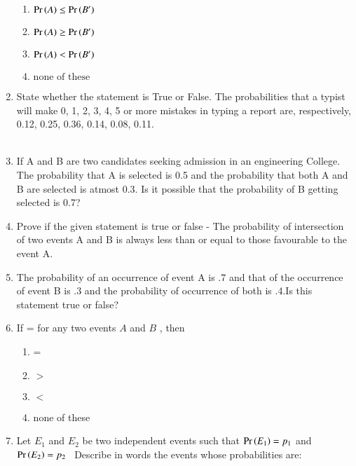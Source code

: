 \begin{enumerate}[label=\thesection.\arabic*,ref=\thesection.\theenumi]
\begin{enumerate}
\item $\Pr\left(A\right) \leq\Pr\left(B^\prime\right)$\\
\item $\Pr\left(A\right) \geq \Pr\left(B^\prime\right)$\\
\item $\Pr\left(A\right) < \Pr\left(B^\prime\right)$\\
\item $\text{none of these}$
\end{enumerate}

\item State whether the statement is True or False. The probabilities that a typist will make 0, 1, 2, 3, 4, 5 or more mistakes in typing a report are, respectively, 0.12, 0.25, 0.36, 0.14, 0.08, 0.11.\\
\solution
\\

\item If A and B are two candidates seeking admission in an engineering College. The probability that A is selected is 0.5 and the probability that both A and B are selected is atmost 0.3. Is it possible that the probability of B getting selected is 0.7?\\

\item Prove if the given statement is true or false - The probability of intersection of two events A and B is always less than or equal to those favourable to the event A.

\item The probability of an occurrence of event A is .7 and that of the occurrence of event B is .3 and the probability of occurrence of both is .4.Is this statement true or false?\\
\solution

\item If  =  for any two events $A$ and $B$ , then
\begin{enumerate}[label=\Alph*)]
\item {}=
\item {} $>$ 
\item {} $<$ 
\item none of these
\end{enumerate}

\item Let $E_1$ and $E_2$ be two independent events such that $\Pr\left(E_1\right) = p_1 $ and $ \Pr\left(E_2\right) = p_2 $ \ Describe in words the events whose probabilities are: 
\begin{enumerate}

\end{enumerate}
\end{enumerate}
